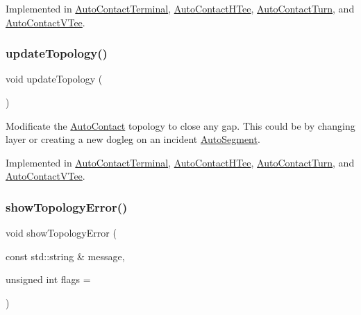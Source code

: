 Implemented in \mbox{\hyperlink{classKatabatic_1_1AutoContactTerminal_a3e218f6934c51380fb15d0e2bd380071}{Auto\+Contact\+Terminal}}, \mbox{\hyperlink{classKatabatic_1_1AutoContactHTee_a3e218f6934c51380fb15d0e2bd380071}{Auto\+Contact\+H\+Tee}}, \mbox{\hyperlink{classKatabatic_1_1AutoContactTurn_a3e218f6934c51380fb15d0e2bd380071}{Auto\+Contact\+Turn}}, and \mbox{\hyperlink{classKatabatic_1_1AutoContactVTee_a3e218f6934c51380fb15d0e2bd380071}{Auto\+Contact\+V\+Tee}}.

\mbox{\label{classKatabatic_1_1AutoContact_a690764ddc997fe9766a79c4b8e0c3e2f}} 
\subsubsection{\texorpdfstring{update\+Topology()}{updateTopology()}}
{\footnotesize\ttfamily void update\+Topology (\begin{DoxyParamCaption}{ }\end{DoxyParamCaption})\hspace{0.3cm}{\ttfamily [pure virtual]}}

Modificate the \mbox{\hyperlink{classKatabatic_1_1AutoContact}{Auto\+Contact}} topology to close any gap. This could be by changing layer or creating a new dogleg on an incident \mbox{\hyperlink{classKatabatic_1_1AutoSegment}{Auto\+Segment}}. 

Implemented in \mbox{\hyperlink{classKatabatic_1_1AutoContactTerminal_af5bf1f5e71204ef84346e4e036175431}{Auto\+Contact\+Terminal}}, \mbox{\hyperlink{classKatabatic_1_1AutoContactHTee_af5bf1f5e71204ef84346e4e036175431}{Auto\+Contact\+H\+Tee}}, \mbox{\hyperlink{classKatabatic_1_1AutoContactTurn_af5bf1f5e71204ef84346e4e036175431}{Auto\+Contact\+Turn}}, and \mbox{\hyperlink{classKatabatic_1_1AutoContactVTee_af5bf1f5e71204ef84346e4e036175431}{Auto\+Contact\+V\+Tee}}.

\mbox{\label{classKatabatic_1_1AutoContact_a66f92d8233776fb858075f78af451997}} 
\subsubsection{\texorpdfstring{show\+Topology\+Error()}{showTopologyError()}}
{\footnotesize\ttfamily void show\+Topology\+Error (\begin{DoxyParamCaption}\item[{const std\+::string \&}]{message,  }\item[{unsigned int}]{flags = {} }\end{DoxyParamCaption})}

